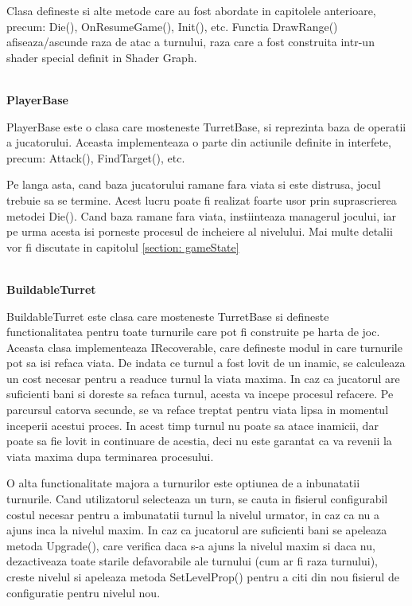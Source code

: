 \documentclass[12pt, a4paper]{article}
\begin{document}
	Clasa defineste si alte metode care au fost abordate in capitolele anterioare, precum: Die(), OnResumeGame(), Init(), etc. Functia DrawRange() afiseaza/ascunde raza de atac a turnului, raza care a fost construita intr-un shader special definit in Shader Graph.
	
	\ \\
	\textbf{PlayerBase}
	
	PlayerBase este o clasa care mosteneste TurretBase, si reprezinta baza de operatii a jucatorului. Aceasta implementeaza o parte din actiunile definite in interfete, precum: Attack(), FindTarget(), etc.
	\newline
	
	Pe langa asta, cand baza jucatorului ramane fara viata si este distrusa, jocul trebuie sa se termine. Acest lucru poate fi realizat foarte usor prin suprascrierea metodei Die(). Cand baza ramane fara viata, instiinteaza managerul jocului, iar pe urma acesta isi porneste procesul de incheiere al nivelului. Mai multe detalii vor fi discutate in capitolul \ref{section: gameState}
	
	\ \\
	\textbf{BuildableTurret}
	
	BuildableTurret este clasa care mosteneste TurretBase si defineste functionalitatea pentru toate turnurile care pot fi construite pe harta de joc. Aceasta clasa implementeaza IRecoverable, care defineste modul in care turnurile pot sa isi refaca viata. De indata ce turnul a fost lovit de un inamic, se calculeaza un cost necesar pentru a readuce turnul la viata maxima. In caz ca jucatorul are suficienti bani si doreste sa refaca turnul, acesta va incepe procesul refacere. Pe parcursul catorva secunde, se va reface treptat pentru viata lipsa in momentul inceperii acestui proces. In acest timp turnul nu poate sa atace inamicii, dar poate sa fie lovit in continuare de acestia, deci nu este garantat ca va revenii la viata maxima dupa terminarea procesului.
	\newline
	
	O alta functionalitate majora a turnurilor este optiunea de a inbunatatii turnurile. Cand utilizatorul selecteaza un turn, se cauta in fisierul configurabil costul necesar pentru a imbunatatii turnul la nivelul urmator, in caz ca nu a ajuns inca la nivelul maxim. In caz ca jucatorul are suficienti bani se apeleaza metoda Upgrade(), care verifica daca s-a ajuns la nivelul maxim si daca nu, dezactiveaza toate starile defavorabile ale turnului (cum ar fi raza turnului), creste nivelul si apeleaza metoda SetLevelProp() pentru a citi din nou fisierul de configuratie pentru nivelul nou.
	\newline
	
\end{document}
